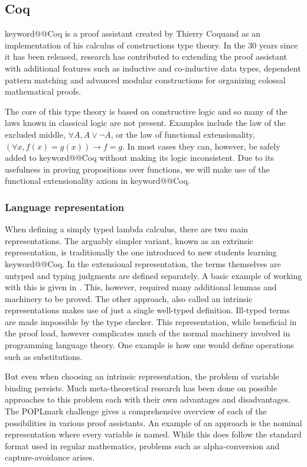 \documentclass[12pt, final]{article}
\makeatletter
\def\<#1>{\csname keyword@@#1\endcsname}
\makeatother
\begin{document}

\subsection{Coq}

\<Coq> is a proof assistant created by Thierry Coquand as an implementation of his calculus of constructions type theory\cite{Coquand1988}.
In the 30 years since it has been released, research has contributed to extending the proof assistant with additional features such as inductive and co-inductive data types\cite{Coquand1990}, dependent pattern matching\cite{Sozeau2010} and advanced modular constructions for organizing colossal mathematical proofs\cite{Sozeau2008}\cite{Mahboubi2013}.

The core of this type theory is based on constructive logic and so many of the laws known in classical logic are not present.
Examples include the law of the excluded middle, $\forall A, A \vee \neg A$, or the law of functional extensionality, $(\forall x, f(x) = g(x)) \rightarrow f = g$.
In most cases they can, however, be safely added to \<Coq> without making its logic inconsistent.
Due to its usefulness in proving propositions over functions, we will make use of the functional extensionality axiom in \<Coq>.

\subsubsection{Language representation}
\label{sec:language_repr}

When defining a simply typed lambda calculus, there are two main representations\cite{plfa2019}.
The arguably simpler variant, known as an extrinsic representation, is traditionally the one introduced to new students learning \<Coq>.
In the extensional representation, the terms themselves are untyped and typing judgments are defined separately. A basic example of working with this is given in \cite{Pierce:SF2}. This, however, required many additional lemmas and machinery to be proved.
The other approach, also called an intrinsic representations makes use of just a single well-typed definition.
Ill-typed terms are made impossible by the type checker.
This representation, while beneficial in the proof load, however complicates much of the normal machinery involved in programming language theory.
One example is how one would define operations such as substitutions.

But even when choosing an intrinsic representation, the problem of variable binding persists.
Much meta-theoretical research has been done on possible approaches to this problem each with their own advantages and disadvantages.
The POPLmark challenge gives a comprehensive overview of each of the possibilities in various proof assistants\cite{Aydemir2005}.
An example of an approach is the nominal representation where every variable is named.
While this does follow the standard format used in regular mathematics, problems such as alpha-conversion and capture-avoidance arises.
\end{document}
